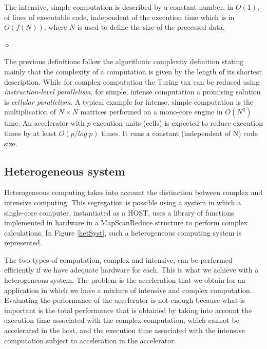 \begin{definition}
The intensive, simple computation is described by a constant number, in $O(1)$, of lines of executable code, independent of the execution time which is in $O(f(N))$, where $N$ is used to define the size of the precessed data.

$\diamond$
\end{definition}

The previous definitions follow the algorithmic complexity \cite{Chaitin70} definition stating  mainly that the complexity of a computation is given by the length of its shortest description. While for complex computation the Turing tax can be reduced using {\em instruction-level parallelism}, for simple, intense computation a promising solution is  {\em cellular parallelism}. A typical example for intense, simple computation is the multiplication of $N \times N$ matrices performed on a mono-core engine in $O(N^3)$ time. An accelerator with $p$ execution units (cells) is expected to reduce execution times by at least $O(p/log \; p)$ times. It runs a constant (independent of N) code size.

\subsection{Heterogeneous system}\label{hetCompSystem}

Heterogeneous computing takes into account the distinction between complex and intensive computing. This segregation is possible using a system in which a single-core computer, instantiated as a HOST, uses a library of functions implemented in hardware in a MapScanReduce structure to perform complex calculations. In Figure \ref{hetSyst}, such a heterogeneous computing system is represented.


The two types of computation, complex and intensive, can be performed efficiently if we have adequate hardware for each. This is what we achieve with a heterogeneous system. The problem is the acceleration that we obtain for an application in which we have a mixture of intensive and complex computation. Evaluating the performance of the accelerator is not enough because what is important is the total performance that is obtained by taking into account the execution time associated with the complex computation, which cannot be accelerated in the host, and the execution time associated with the intensive computation subject to acceleration in the accelerator.

